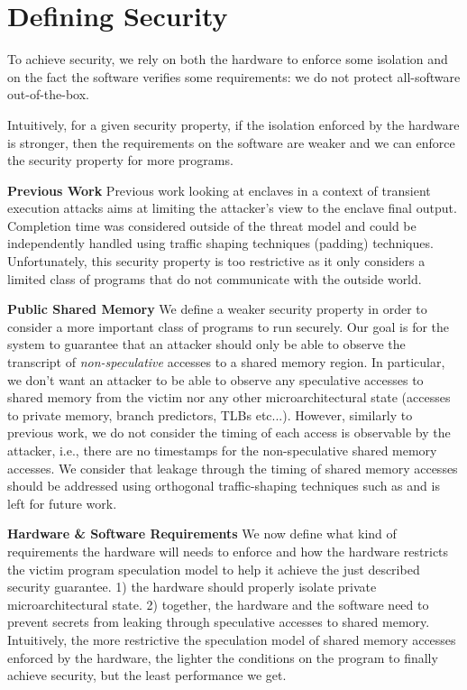 \section{Defining Security}
To achieve security, we rely on both the hardware to enforce some isolation and on the fact the software verifies some requirements: we do not protect all-software out-of-the-box.

Intuitively, for a given security property, if the isolation enforced by the hardware is stronger, then the requirements on the software are weaker and we can enforce the security property for more programs.

\noindent\textbf{Previous Work}
Previous work looking at enclaves in a context of transient execution attacks \cite{bourgeat2019mi6}
aims at limiting the attacker's view to the enclave final output.
Completion time was considered outside of the threat model and could be independently handled using traffic shaping techniques (padding) techniques.
Unfortunately, this security property is too restrictive as it only considers a limited class of programs that do not communicate with the outside world.

\noindent\textbf{Public Shared Memory}
We define a weaker security property in order to consider a more important class of programs to run securely.
Our goal is for the system to guarantee that an attacker should only be able to observe the transcript of 
\emph{non-speculative} accesses to a shared memory region. 
In particular, we don't want an attacker to be able to observe any speculative accesses to shared memory from the victim nor any other microarchitectural state (accesses to private memory, branch predictors, TLBs etc...).
However, similarly to previous work, we do not consider the timing of each access is observable by the attacker, i.e., there are no timestamps for the non-speculative shared memory accesses.
We consider that leakage through the timing of shared memory accesses should be addressed using orthogonal traffic-shaping techniques such as \cite{deutsch2022dagguise, wang2014timing, shafiee2015avoiding, zhou2017camouflage} and is left for future work.

\noindent\textbf{Hardware \& Software Requirements}
We now define what kind of requirements the hardware will needs to enforce and how the hardware restricts the victim program speculation model to help it achieve the just described security guarantee.
1) the hardware should properly isolate private microarchitectural state.
2) together, the hardware and the software need to prevent secrets from leaking through speculative accesses to shared memory.
Intuitively, the more restrictive the speculation model of shared memory accesses enforced by the hardware, the lighter the conditions on the program to finally achieve security, but the least performance we get.

